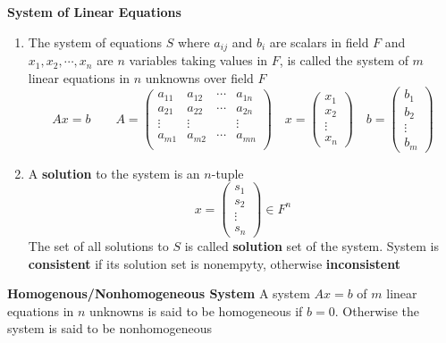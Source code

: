 \documentclass[11pt]{article}
\begin{document}
\begin{defn*}
    \textbf{System of Linear Equations} 
    \begin{enumerate}
        \item The system of equations $S$ where $a_{ij}$ and $b_i$ are scalars in field $F$ and $x_1,x_2,\cdots, x_n$ are $n$ variables taking values in $F$, is called the system of $m$ linear equations in $n$ unknowns over field $F$
        \[
            Ax = b 
            \qquad 
            A = 
            \begin{pmatrix}
                a_{11} & a_{12} & \cdots & a_{1n} \\ 
                a_{21} & a_{22} & \cdots & a_{2n} \\ 
                \vdots & \vdots & & \vdots \\
                a_{m1} & a_{m2} & \cdots & a_{mn} \\ 
            \end{pmatrix}    
            \quad 
            x =  
            \begin{pmatrix}
               x_1 \\ x_2 \\ \vdots \\ x_n 
            \end{pmatrix}
            \quad 
            b = 
            \begin{pmatrix}
                b_1 \\ b_2 \\ \vdots \\ b_m
            \end{pmatrix}
        \]
        \item A \textbf{solution} to the system is an $n$-tuple 
        \[
            x = 
            \begin{pmatrix}
                s_1 \\ s_2 \\ \vdots \\ s_n
            \end{pmatrix}
            \in F^n
        \]
        The set of all solutions to $S$ is called \textbf{solution} set of the system. System is \textbf{consistent} if its solution set is nonempyty, otherwise \textbf{inconsistent}
    \end{enumerate}
\end{defn*}

\begin{defn*}
    \textbf{Homogenous/Nonhomogeneous System} A system $Ax=b$ of $m$ linear equations in $n$ unknowns is said to be homogeneous if $b=0$. Otherwise the system is said to be nonhomogeneous
\end{defn*}
\end{document}
